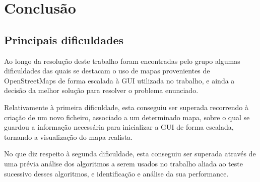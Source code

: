 \documentclass[relatorio.tex]{subfiles}
\begin{document}
\section{Conclusão}
\label{sec:conclusion}

\subsection{Principais dificuldades}
\label{subsec:difficulties}

Ao longo da resolução deste trabalho foram encontradas pelo grupo algumas dificuldades das quais se destacam o uso de mapas provenientes de OpenStreetMaps de forma escalada à GUI utilizada no trabalho, e ainda a decisão da melhor solução para resolver o problema enunciado.

Relativamente à primeira dificuldade, esta conseguiu ser superada recorrendo à criação de um novo ficheiro, associado a um determinado mapa, sobre o qual se guardou a informação necessária para inicializar a GUI de forma escalada, tornando a visualização do mapa realista.

No que diz respeito à segunda dificuldade, esta conseguiu ser superada através de uma prévia análise dos algoritmos a serem usados no trabalho aliada ao teste sucessivo desses algoritmos, e identificação e análise da sua performance.
\end{document}
